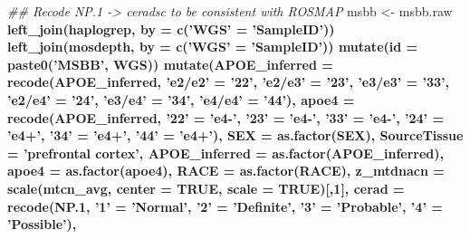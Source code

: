 \documentclass[]{book}
\newenvironment{Shaded}{\begin{snugshade}}{\end{snugshade}}
\newcommand{\CommentTok}[1]{\textcolor[rgb]{0.56,0.35,0.01}{\textit{#1}}}
\newcommand{\DataTypeTok}[1]{\textcolor[rgb]{0.13,0.29,0.53}{#1}}
\newcommand{\DecValTok}[1]{\textcolor[rgb]{0.00,0.00,0.81}{#1}}
\newcommand{\FloatTok}[1]{\textcolor[rgb]{0.00,0.00,0.81}{#1}}
\newcommand{\KeywordTok}[1]{\textcolor[rgb]{0.13,0.29,0.53}{\textbf{#1}}}
\newcommand{\NormalTok}[1]{#1}
\newcommand{\OperatorTok}[1]{\textcolor[rgb]{0.81,0.36,0.00}{\textbf{#1}}}
\newcommand{\OtherTok}[1]{\textcolor[rgb]{0.56,0.35,0.01}{#1}}
\newcommand{\StringTok}[1]{\textcolor[rgb]{0.31,0.60,0.02}{#1}}
\begin{document}
\begin{Shaded}
\begin{Highlighting}[]
\CommentTok{## Recode NP.1 -> ceradsc to be consistent with ROSMAP}
\NormalTok{msbb <-}\StringTok{ }\NormalTok{msbb.raw }\OperatorTok{%>%}
\StringTok{  }\KeywordTok{left_join}\NormalTok{(haplogrep, }\DataTypeTok{by =} \KeywordTok{c}\NormalTok{(}\StringTok{'WGS'}\NormalTok{ =}\StringTok{ 'SampleID'}\NormalTok{)) }\OperatorTok{%>%}
\StringTok{  }\KeywordTok{left_join}\NormalTok{(mosdepth, }\DataTypeTok{by =} \KeywordTok{c}\NormalTok{(}\StringTok{'WGS'}\NormalTok{ =}\StringTok{ 'SampleID'}\NormalTok{)) }\OperatorTok{%>%}
\StringTok{  }\KeywordTok{mutate}\NormalTok{(}\DataTypeTok{id =} \KeywordTok{paste0}\NormalTok{(}\StringTok{'MSBB'}\NormalTok{, WGS)) }\OperatorTok{%>%}
\StringTok{  }\KeywordTok{mutate}\NormalTok{(}\DataTypeTok{APOE_inferred =} \KeywordTok{recode}\NormalTok{(APOE_inferred, }\StringTok{'e2/e2'}\NormalTok{ =}\StringTok{ '22'}\NormalTok{, }\StringTok{'e2/e3'}\NormalTok{ =}\StringTok{ '23'}\NormalTok{, }\StringTok{'e3/e3'}\NormalTok{ =}\StringTok{ '33'}\NormalTok{, }\StringTok{'e2/e4'}\NormalTok{ =}\StringTok{ '24'}\NormalTok{, }\StringTok{'e3/e4'}\NormalTok{ =}\StringTok{ '34'}\NormalTok{, }\StringTok{'e4/e4'}\NormalTok{ =}\StringTok{ '44'}\NormalTok{),}
        \DataTypeTok{apoe4 =} \KeywordTok{recode}\NormalTok{(APOE_inferred, }\StringTok{'22'}\NormalTok{ =}\StringTok{ 'e4-'}\NormalTok{, }\StringTok{'23'}\NormalTok{ =}\StringTok{ 'e4-'}\NormalTok{, }\StringTok{'33'}\NormalTok{ =}\StringTok{ 'e4-'}\NormalTok{, }\StringTok{'24'}\NormalTok{ =}\StringTok{ 'e4+'}\NormalTok{, }\StringTok{'34'}\NormalTok{ =}\StringTok{ 'e4+'}\NormalTok{, }\StringTok{'44'}\NormalTok{ =}\StringTok{ 'e4+'}\NormalTok{),}
        \DataTypeTok{SEX =} \KeywordTok{as.factor}\NormalTok{(SEX), }
        \DataTypeTok{SourceTissue =} \StringTok{'prefrontal cortex'}\NormalTok{,}
        \DataTypeTok{APOE_inferred =} \KeywordTok{as.factor}\NormalTok{(APOE_inferred), }
        \DataTypeTok{apoe4 =} \KeywordTok{as.factor}\NormalTok{(apoe4), }
        \DataTypeTok{RACE =} \KeywordTok{as.factor}\NormalTok{(RACE), }
        \DataTypeTok{z_mtdnacn =} \KeywordTok{scale}\NormalTok{(mtcn_avg, }\DataTypeTok{center =} \OtherTok{TRUE}\NormalTok{, }\DataTypeTok{scale =} \OtherTok{TRUE}\NormalTok{)[,}\DecValTok{1}\NormalTok{],}
        \DataTypeTok{cerad =} \KeywordTok{recode}\NormalTok{(NP}\FloatTok{.1}\NormalTok{, }\StringTok{'1'}\NormalTok{ =}\StringTok{ 'Normal'}\NormalTok{, }\StringTok{'2'}\NormalTok{ =}\StringTok{ 'Definite'}\NormalTok{, }\StringTok{'3'}\NormalTok{ =}\StringTok{ 'Probable'}\NormalTok{, }\StringTok{'4'}\NormalTok{ =}\StringTok{ 'Possible'}\NormalTok{),}
}}}}
\end{Highlighting}
\end{Shaded}
\end{document}
